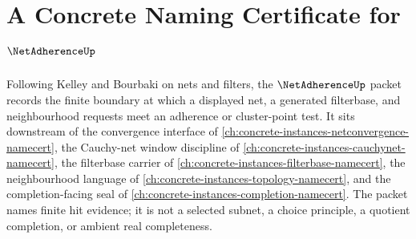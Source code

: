 \chapter{A Concrete Naming Certificate for $\NetAdherenceUp$}
\label{ch:concrete-instances-net-adherence-namecert}

Following Kelley and Bourbaki on nets and filters, the $\NetAdherenceUp$ packet records the finite boundary at which a displayed net, a generated filterbase, and neighbourhood requests meet an adherence or cluster-point test. It sits downstream of the convergence interface of \autoref{ch:concrete-instances-netconvergence-namecert}, the Cauchy-net window discipline of \autoref{ch:concrete-instances-cauchynet-namecert}, the filterbase carrier of \autoref{ch:concrete-instances-filterbase-namecert}, the neighbourhood language of \autoref{ch:concrete-instances-topology-namecert}, and the completion-facing seal of \autoref{ch:concrete-instances-completion-namecert}. The packet names finite hit evidence; it is not a selected subnet, a choice principle, a quotient completion, or ambient real completeness.

